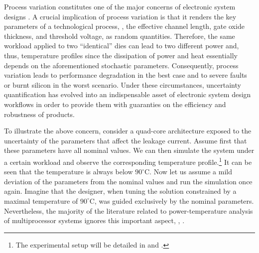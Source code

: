 
Process variation constitutes one of the major concerns of electronic system designs \cite{chandrakasan2001, srivastava2010}.
A crucial implication of process variation is that it renders the key parameters of a technological process, \eg, the effective channel length, gate oxide thickness, and threshold voltage, as random quantities.
Therefore, the same workload applied to two ``identical'' dies can lead to two different power and, thus, temperature profiles since the dissipation of power and heat essentially depends on the aforementioned stochastic parameters.
Consequently, process variation leads to performance degradation in the best case and to severe faults or burnt silicon in the worst scenario.
Under these circumstances, uncertainty quantification \cite{xiu2010, maitre2010} has evolved into an indispensable asset of electronic system design workflows in order to provide them with guaranties on the efficiency and robustness of products.

To illustrate the above concern, consider a quad-core architecture exposed to the uncertainty of the parameters that affect the leakage current.
Assume first that these parameters have all nominal values.
We can then simulate the system under a certain workload and observe the corresponding temperature profile.\footnote{The experimental setup will be detailed in  and .}
It can be seen that the temperature is always below $90^{\circ}$C.
Now let us assume a mild deviation of the parameters from the nominal values and run the simulation once again.
Imagine that the designer, when tuning the solution constrained by a maximal temperature of $90^\circ$C, was guided exclusively by the nominal parameters.
Nevertheless, the majority of the literature related to power-temperature analysis of multiprocessor systems ignores this important aspect, \eg, \cite{rao2009, rai2011, thiele2011, ukhov2012}.

